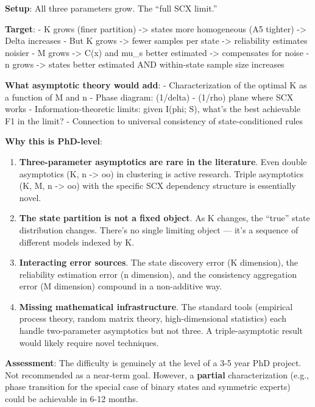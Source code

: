 \documentclass[
  12pt,
]{article}
\begin{document}
\textbf{Setup}: All three parameters grow. The ``full SCX limit.''

\textbf{Target}: - K grows (finer partition) -\textgreater{} states more
homogeneous (A5 tighter) -\textgreater{} Delta increases - But K grows
-\textgreater{} fewer samples per state -\textgreater{} reliability
estimates noisier - M grows -\textgreater{} C(x) and mu\_s better
estimated -\textgreater{} compensates for noise - n grows
-\textgreater{} states better estimated AND within-state sample size
increases

\textbf{What asymptotic theory would add}: - Characterization of the
optimal K as a function of M and n - Phase diagram: (1/delta) - (1/rho)
plane where SCX works - Information-theoretic limits: given I(phi; S),
what's the best achievable F1 in the limit? - Connection to universal
consistency of state-conditioned rules

\textbf{Why this is PhD-level}:

\begin{enumerate}
\def\labelenumi{\arabic{enumi}.}
\item
  \textbf{Three-parameter asymptotics are rare in the literature}. Even
  double asymptotics (K, n -\textgreater{} oo) in clustering is active
  research. Triple asymptotics (K, M, n -\textgreater{} oo) with the
  specific SCX dependency structure is essentially novel.
\item
  \textbf{The state partition is not a fixed object}. As K changes, the
  ``true'' state distribution changes. There's no single limiting object
  --- it's a sequence of different models indexed by K.
\item
  \textbf{Interacting error sources}. The state discovery error (K
  dimension), the reliability estimation error (n dimension), and the
  consistency aggregation error (M dimension) compound in a non-additive
  way.
\item
  \textbf{Missing mathematical infrastructure}. The standard tools
  (empirical process theory, random matrix theory, high-dimensional
  statistics) each handle two-parameter asymptotics but not three. A
  triple-asymptotic result would likely require novel techniques.
\end{enumerate}

\textbf{Assessment}: The difficulty is genuinely at the level of a 3-5
year PhD project. Not recommended as a near-term goal. However, a
\textbf{partial} characterization (e.g., phase transition for the
special case of binary states and symmetric experts) could be achievable
in 6-12 months.
\end{document}
